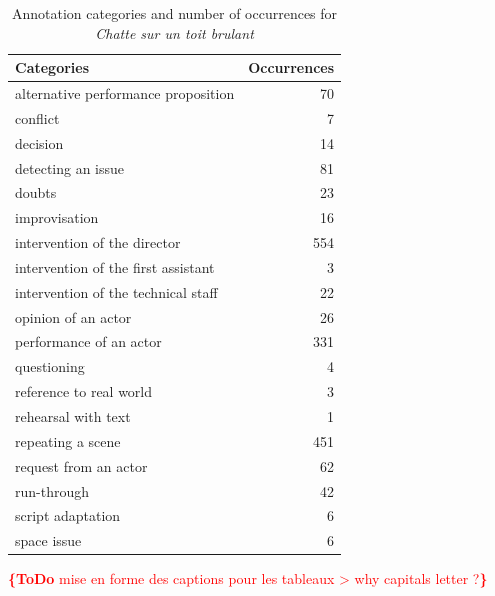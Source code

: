 \documentclass[conference]{IEEEtran}
\newcommand{\todo}[1]{\noindent\textcolor{red}{{\bf \{ToDo} #1{\bf \}}}}
\begin{document}
\begin{table}
\centering
\begin{tabular}{|p{4cm}|r|}
\hline 
Categories & Occurrences \\ 
\hline 
alternative performance proposition & 70 \\ 
\hline 
conflict & 7 \\ 
decision & 14 \\ 
\hline 
detecting an issue & 81 \\ 
\hline 
doubts & 23 \\ 
\hline 
improvisation & 16 \\ 
\hline 
intervention of the director & 554 \\ 
\hline 
intervention of the first assistant & 3 \\ 
\hline 
intervention of the technical staff & 22 \\ 
\hline 
opinion of an actor & 26 \\ 
\hline 
performance of an actor & 331 \\ 
\hline 
questioning & 4 \\ 
\hline 
reference to real world & 3 \\ 
\hline 
rehearsal with text & 1 \\ 
\hline 
repeating a scene & 451 \\ 
\hline 
request from an actor & 62 \\ 
\hline 
run-through & 42 \\ 
\hline 
script adaptation & 6 \\ 
\hline 
space issue & 6 \\ 
\hline 
\end{tabular}
\label{table:categories1}
\caption{Annotation categories and number of occurrences for \emph{Chatte sur un toit brulant}}
\end{table}
\todo{mise en forme des captions pour les tableaux > why capitals letter ?} 
\end{document}

